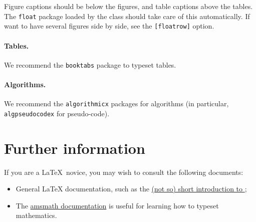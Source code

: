 \documentclass{iacrcc}
\begin{document}
Figure captions should be below the figures, and table captions above
the tables.  The \texttt{float} package loaded by the class should
take care of this automatically.  If want to have several figures side
by side, see the \texttt{[floatrow]} option.

\paragraph{Tables.}

We recommend the \texttt{booktabs} package to typeset tables.

\paragraph{Algorithms.}

We recommend the \texttt{algorithmicx} packages for algorithms (in
particular, \texttt{algpseudocodex} for pseudo-code).

\section{Further information}

If you are a \LaTeX\ novice, you may wish to consult the following documents:
\begin{itemize}
\item General \LaTeX{} documentation, such as the
  \href{http://mirrors.ctan.org/info/lshort/english/lshort.pdf}{(not
    so) short introduction to \LaTeXe};
\item The
  \href{https://mirror.mwt.me/ctan/macros/latex/required/amsmath/amsldoc.pdf}{amsmath
    documentation} is useful for learning how to typeset mathematics.
\end{itemize}

\renewcommand{\refname}{Sample References}

\end{document}
